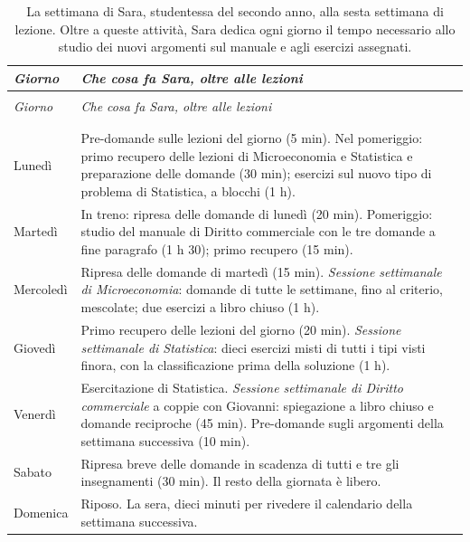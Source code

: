 \begingroup\small\captionsetup{position=below}
\setlength{\LTpre}{1.2\baselineskip}\setlength{\LTpost}{1.2\baselineskip}
\begin{longtable}{@{}>{\raggedright\arraybackslash}p{}>{\raggedright\arraybackslash}p{}@{}}
    \toprule
    \textit{Giorno} & \textit{Che cosa fa Sara, oltre alle lezioni} \\
    \midrule
    \endfirsthead
    \multicolumn{2}{@{}l}{\small\emph{Tabella~\ref{tab:settimana} (continua)}} \\
    \toprule
    \textit{Giorno} & \textit{Che cosa fa Sara, oltre alle lezioni} \\
    \midrule
    \endhead
    \midrule
    \multicolumn{2}{r@{}}{\small\emph{segue}} \\
    \endfoot
    \bottomrule
  \caption{La settimana di Sara, studentessa del secondo anno, alla
    sesta settimana di lezione. Oltre a queste attività, Sara dedica
    ogni giorno il tempo necessario allo studio dei nuovi argomenti
    sul manuale e agli esercizi assegnati.}
  \label{tab:settimana} \\
    \endlastfoot
    Lunedì & Pre-domande sulle lezioni del giorno (5 min). Nel
      pomeriggio: primo recupero delle lezioni di Microeconomia e
      Statistica e preparazione delle domande (30 min); esercizi
      sul nuovo tipo di problema di Statistica, a blocchi (1 h). \\
    \addlinespace
    Martedì & In treno: ripresa delle domande di lunedì (20 min).
      Pomeriggio: studio del manuale di Diritto commerciale con le tre
      domande a fine paragrafo (1 h 30); primo recupero (15 min). \\
    \addlinespace
    Mercoledì & Ripresa delle domande di martedì (15 min).
      \emph{Sessione settimanale di Microeconomia}: domande di tutte le
      settimane, fino al criterio, mescolate; due esercizi a libro
      chiuso (1 h). \\
    \addlinespace
    Giovedì & Primo recupero delle lezioni del giorno (20 min).
      \emph{Sessione settimanale di Statistica}: dieci esercizi misti
      di tutti i tipi visti finora, con la classificazione prima della
      soluzione (1 h). \\
    \addlinespace
    Venerdì & Esercitazione di Statistica. \emph{Sessione settimanale di
      Diritto commerciale} a coppie con Giovanni: spiegazione a libro
      chiuso e domande reciproche (45 min). Pre-domande sugli argomenti
      della settimana successiva (10 min). \\
    \addlinespace
    Sabato & Ripresa breve delle domande in scadenza di tutti e tre gli
      insegnamenti (30 min). Il resto della giornata è libero. \\
    \addlinespace
    Domenica & Riposo. La sera, dieci minuti per rivedere il calendario
      della settimana successiva. \\
    \end{longtable}
\endgroup


